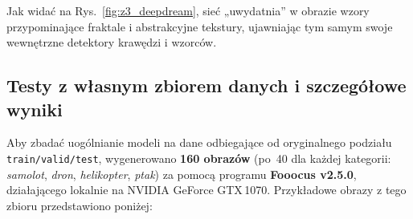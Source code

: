 Jak widać na Rys.~\ref{fig:z3_deepdream}, sieć „uwydatnia” w obrazie wzory przypominające fraktale i abstrakcyjne tekstury, ujawniając tym samym swoje wewnętrzne detektory krawędzi i wzorców.


\subsection{Testy z własnym zbiorem danych i szczegółowe wyniki}
Aby zbadać uogólnianie modeli na dane odbiegające od oryginalnego podziału \texttt{train/valid/test}, wygenerowano \textbf{160 obrazów} (po~40 dla każdej kategorii: \textit{samolot}, \textit{dron}, \textit{helikopter}, \textit{ptak}) za pomocą programu \textbf{Fooocus v2.5.0}, działającego lokalnie na NVIDIA GeForce GTX\,1070.
Przykładowe obrazy z tego zbioru przedstawiono poniżej:

